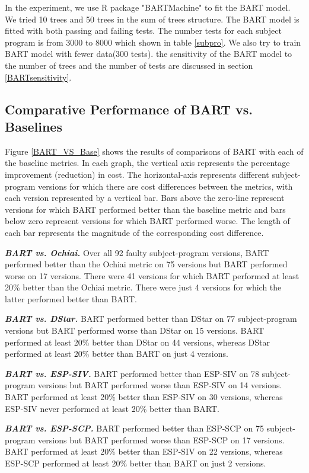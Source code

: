 In the experiment, we use R package "BARTMachine" \cite{BARTMachine} to fit the BART model. We tried 10 trees and 50 trees in the sum of trees structure.  The BART model is fitted with both passing and failing tests. The number tests for each subject program is from 3000 to 8000 which shown in table \ref{subpro}. We also try to train BART model with fewer data(300 tests). the sensitivity of the BART model to the number of trees and the number of tests are discussed in section \ref{BARTsensitivity}.

\subsection{Comparative Performance of BART vs. Baselines}

Figure \ref{BART_VS_Base} shows the results of comparisons of BART with each of the baseline metrics.  In each graph, the vertical axis represents the percentage improvement (reduction) in cost. The horizontal-axis represents different subject-program versions for which there are cost differences between the metrics, with each version represented by a vertical bar.   Bars above the zero-line represent versions for which BART performed better than the baseline metric and bars below zero represent versions for which BART performed worse.  The length of each bar represents the magnitude of the corresponding cost difference.

\textit{\textbf{ BART vs. Ochiai.}}  Over all 92 faulty subject-program versions, BART performed better than the Ochiai metric on 75 versions but BART performed worse on 17 versions.  There were 41 versions for which BART performed at least 20\% better than the Ochiai metric.  There were just 4 versions for which the latter performed better than BART.

\textit{\textbf{ BART vs. DStar.}}  BART performed better than DStar on 77 subject-program versions but BART performed worse than DStar on 15 versions.  BART performed at least 20\% better than DStar on 44 versions, whereas DStar performed at least 20\% better than BART on just 4 versions.

\textit{\textbf{ BART vs. ESP-SIV.}} BART performed better than ESP-SIV on 78 subject-program versions but BART performed worse than ESP-SIV on 14 versions.  BART performed at least 20\% better than ESP-SIV on 30 versions, whereas ESP-SIV never performed at least 20\% better than BART.

\textit{\textbf{ BART vs. ESP-SCP.}}  BART performed better than ESP-SCP on 75 subject-program versions but BART performed worse than ESP-SCP on 17 versions.  BART performed at least 20\% better than ESP-SIV on 22 versions, whereas ESP-SCP performed at least 20\% better than BART on just 2 versions.

